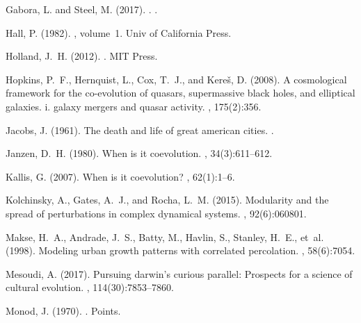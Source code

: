 \documentclass[letterpaper]{article}
\begin{document}
\begin{thebibliography}{}
{Gabora}, L. and {Steel}, M. (2017).
.
.

Hall, P. (1982).
, volume~1.
\newblock Univ of California Press.

Holland, J.~H. (2012).
.
\newblock MIT Press.

Hopkins, P.~F., Hernquist, L., Cox, T.~J., and Kere{\v{s}}, D. (2008).
\newblock A cosmological framework for the co-evolution of quasars,
  supermassive black holes, and elliptical galaxies. i. galaxy mergers and
  quasar activity.
, 175(2):356.

Jacobs, J. (1961).
\newblock The death and life of great american cities.
.

Janzen, D.~H. (1980).
\newblock When is it coevolution.
, 34(3):611--612.

Kallis, G. (2007).
\newblock When is it coevolution?
, 62(1):1--6.

Kolchinsky, A., Gates, A.~J., and Rocha, L.~M. (2015).
\newblock Modularity and the spread of perturbations in complex dynamical
  systems.
, 92(6):060801.

Makse, H.~A., Andrade, J.~S., Batty, M., Havlin, S., Stanley, H.~E., et~al.
  (1998).
\newblock Modeling urban growth patterns with correlated percolation.
, 58(6):7054.

Mesoudi, A. (2017).
\newblock Pursuing darwin's curious parallel: Prospects for a science of
  cultural evolution.
,
  114(30):7853--7860.

Monod, J. (1970).
.
\newblock Points.


\end{thebibliography}
\end{document}
